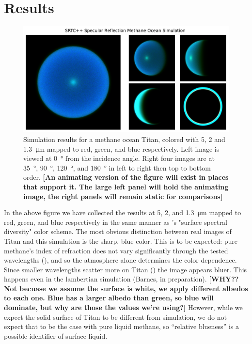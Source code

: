 \documentclass{article}
\begin{document}
\section{Results}

\begin{figure}[htb]
\includegraphics[scale = 0.5]{SpecularSim.pdf}
\centering
\caption{Simulation results for a methane ocean Titan, colored with 5, 2 and \qty{1.3}{\micro\meter} mapped to red, green, and blue respectively. Left image is viewed at \qty{0}{\degree} from the incidence angle. Right four images are at  \qty{35}{\degree},  \qty{90}{\degree},  \qty{120}{\degree}, and  \qty{180}{\degree} in left to right then top to bottom order. \textbf{\color{red} [An animating version of the figure will exist in places that support it. The large left panel will hold the animating image, the right panels will remain static for comparisons] \color{black}}}
\label{fig:6}
\end{figure}

In the above figure we have collected the results at 5, 2, and \qty{1.3}{\micro\meter} mapped to red, green, and blue respectively in the same manner as \cite{Barnes2018}'s "surface spectral diversity" color scheme. The most obvious distinction between real images of Titan and this simulation is the sharp, blue color. This is to be expected: pure methane's index of refraction does not vary significantly through the tested wavelengths (\cite{Martonchik1994}), and so the atmosphere alone determines the color dependence. Since smaller wavelengths scatter more on Titan (\cite{EsSayeh2023}) the image appears bluer. This happens even in the lambertian simulation (Barnes, in preparation). \textbf{\color{red} [WHY?? Not becuase we assume the surface is white, we apply different albedos to each one. Blue has a larger albedo than green, so blue will dominate, but why are those the values we're using?] \color{black}} However, while we expect the solid surface of Titan to be different from simulation, we do not expect that to be the case with pure liquid methane, so ``relative blueness'' is a possible identifier of surface liquid. 
\end{document}
